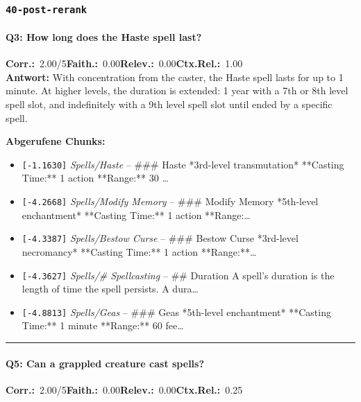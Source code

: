 \subsubsection*{\texttt{40-post-rerank}}
\label{app:samples:40_post_rerank}

\paragraph{Q3: How long does the Haste spell last?}
\noindent \textbf{Corr.:}~2.00/5\quad \textbf{Faith.:}~0.00\quad \textbf{Relev.:}~0.00\quad \textbf{Ctx.Rel.:}~1.00\\

\noindent\textbf{Antwort:} With concentration from the caster, the Haste spell lasts for up to 1 minute. At higher levels, the duration is extended: 1 year with a 7th or 8th level spell slot, and indefinitely with a 9th level spell slot until ended by a specific spell.

\noindent\textbf{Abgerufene Chunks:}
\begin{itemize}[noitemsep, topsep=2pt]
  \item[\textbf{\#1}] \texttt{[-1.1630]} \textit{Spells/Haste} -- \#\#\# Haste  *3rd-level transmutation*  **Casting Time:** 1 action  **Range:** 30 \ldots
  \item[\textbf{\#2}] \texttt{[-4.2668]} \textit{Spells/Modify Memory} -- \#\#\# Modify Memory  *5th-level enchantment*  **Casting Time:** 1 action  **Range:\ldots
  \item[\textbf{\#3}] \texttt{[-4.3387]} \textit{Spells/Bestow Curse} -- \#\#\# Bestow Curse  *3rd-level necromancy*  **Casting Time:** 1 action  **Range:**\ldots
  \item[\textbf{\#4}] \texttt{[-4.3627]} \textit{Spells/# Spellcasting} -- \#\# Duration  A spell's duration is the length of time the spell persists. A dura\ldots
  \item[\textbf{\#5}] \texttt{[-4.8813]} \textit{Spells/Geas} -- \#\#\# Geas  *5th-level enchantment*  **Casting Time:** 1 minute  **Range:** 60 fee\ldots
\end{itemize}
\vspace{4pt}
\hrule
\vspace{6pt}

\paragraph{Q5: Can a grappled creature cast spells?}
\noindent \textbf{Corr.:}~2.00/5\quad \textbf{Faith.:}~0.00\quad \textbf{Relev.:}~0.00\quad \textbf{Ctx.Rel.:}~0.25\\

